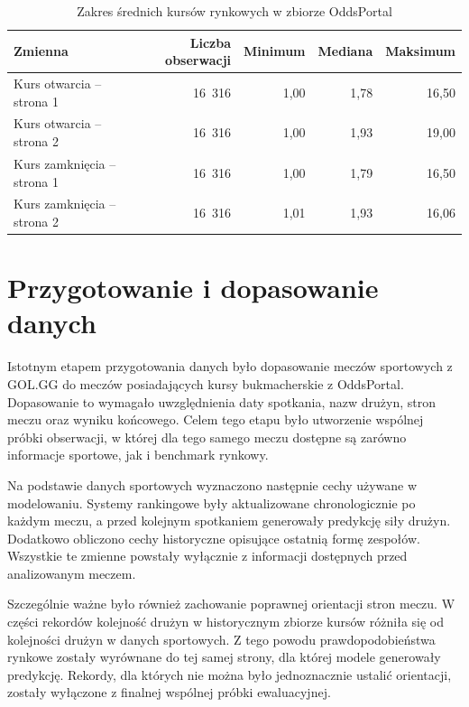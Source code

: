 \begin{table}[H]
    \centering
    \caption{Zakres średnich kursów rynkowych w zbiorze OddsPortal}
    \label{tab:odds_value_ranges}
    \begin{tabular}{lrrrr}
        \toprule
        Zmienna & Liczba obserwacji & Minimum & Mediana & Maksimum \\
        \midrule
        Kurs otwarcia -- strona 1 & 16~316 & 1{,}00 & 1{,}78 & 16{,}50 \\
        Kurs otwarcia -- strona 2 & 16~316 & 1{,}00 & 1{,}93 & 19{,}00 \\
        Kurs zamknięcia -- strona 1 & 16~316 & 1{,}00 & 1{,}79 & 16{,}50 \\
        Kurs zamknięcia -- strona 2 & 16~316 & 1{,}01 & 1{,}93 & 16{,}06 \\
        \bottomrule
    \end{tabular}
\end{table}

\section{Przygotowanie i dopasowanie danych}

Istotnym etapem przygotowania danych było dopasowanie meczów sportowych z GOL.GG do meczów posiadających kursy bukmacherskie z OddsPortal. Dopasowanie to wymagało uwzględnienia daty spotkania, nazw drużyn, stron meczu oraz wyniku końcowego. Celem tego etapu było utworzenie wspólnej próbki obserwacji, w której dla tego samego meczu dostępne są zarówno informacje sportowe, jak i benchmark rynkowy.

Na podstawie danych sportowych wyznaczono następnie cechy używane w modelowaniu. Systemy rankingowe były aktualizowane chronologicznie po każdym meczu, a przed kolejnym spotkaniem generowały predykcję siły drużyn. Dodatkowo obliczono cechy historyczne opisujące ostatnią formę zespołów. Wszystkie te zmienne powstały wyłącznie z informacji dostępnych przed analizowanym meczem.

Szczególnie ważne było również zachowanie poprawnej orientacji stron meczu. W części rekordów kolejność drużyn w historycznym zbiorze kursów różniła się od kolejności drużyn w danych sportowych. Z tego powodu prawdopodobieństwa rynkowe zostały wyrównane do tej samej strony, dla której modele generowały predykcję. Rekordy, dla których nie można było jednoznacznie ustalić orientacji, zostały wyłączone z finalnej wspólnej próbki ewaluacyjnej.

